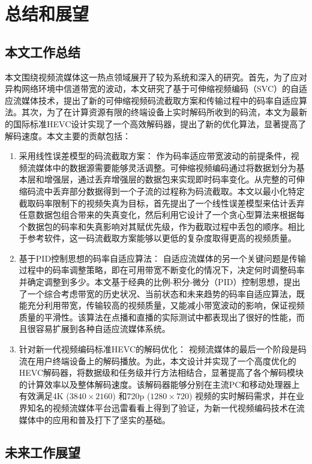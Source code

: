 \chapter{总结和展望}

\section{本文工作总结}

本文围绕视频流媒体这一热点领域展开了较为系统和深入的研究。首先，为了应对异构网络环境中信道带宽的波动，本文研究了基于可伸缩视频编码（SVC）的自适应流媒体技术，提出了新的可伸缩视频码流截取方案和传输过程中的码率自适应算法。其次，为了在计算资源有限的终端设备上实时解码所收到的码流，本文为最新的国际标准HEVC设计实现了一个高效解码器，提出了新的优化算法，显著提高了解码速度。本文主要的贡献包括：
\begin{enumerate}
\item {采用线性误差模型的码流截取方案：}
作为码率适应带宽波动的前提条件，视频流媒体中的数据源需要能够灵活调整。可伸缩视频编码通过将数据划分为基本层和增强层，通过丢弃增强层的数据包来实现即时码率变化。从完整的可伸缩码流中丢弃部分数据得到一个子流的过程称为码流截取。本文以最小化特定截取码率限制下的视频失真为目标，首先提出了一个线性误差模型来估计丢弃任意数据包组合带来的失真变化，然后利用它设计了一个贪心型算法来根据每个数据包的码率和失真影响对其赋优先级，作为截取过程中丢包的顺序。相比于参考软件，这一码流截取方案能够以更低的复杂度取得更高的视频质量。
\item {基于PID控制思想的码率自适应算法：}
自适应流媒体的另一个关键问题是传输过程中的码率调整策略，即在可用带宽不断变化的情况下，决定何时调整码率并确定调整到多少。本文基于经典的比例-积分-微分（PID）控制思想，提出了一个综合考虑带宽的历史状况、当前状态和未来趋势的码率自适应算法，既能充分利用带宽，传输较高的视频质量，又能减小带宽波动的影响，保证视频质量的平滑性。该算法在点播和直播的实际测试中都表现出了很好的性能，而且很容易扩展到各种自适应流媒体系统。
\item {针对新一代视频编码标准HEVC的解码优化：}
视频流媒体的最后一个阶段是码流在用户终端设备上的解码播放。为此，本文设计并实现了一个高度优化的HEVC解码器，将数据级和任务级并行方法相结合，显著提高了各个解码模块的计算效率以及整体解码速度。该解码器能够分别在主流PC和移动处理器上有效满足4K ($3840 \times 2160$) 和720p ($1280 \times 720$) 视频的实时解码需求，并在业界知名的视频流媒体平台迅雷看看上得到了验证，为新一代视频编码技术在流媒体中的应用和普及打下了坚实的基础。 
\end{enumerate}

\section{未来工作展望}

